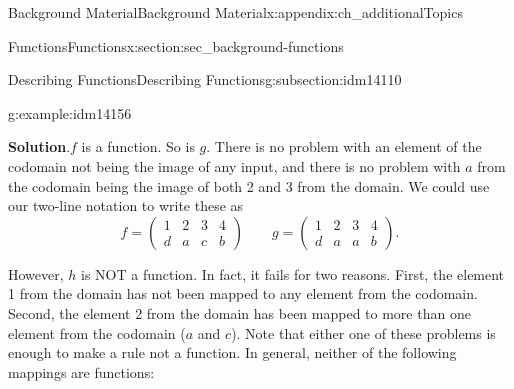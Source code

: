 \documentclass[oneside,10pt,]{book}
\numberwithin{equation}{chapter}
\newcommand{\amp}{&}
\begin{document}
\begin{appendixptx}{Background Material}{}{Background Material}{}{}{x:appendix:ch_additionalTopics}
\begin{sectionptx}{Functions}{}{Functions}{}{}{x:section:sec_background-functions}
\begin{subsectionptx}{Describing Functions}{}{Describing Functions}{}{}{g:subsection:idm14110}
\begin{example}{}{g:example:idm14156}
\begin{sidebyside}{3}{0.0416666666666667}{0.0416666666666667}{0.0833333333333333}
\begin{sbspanel}{0.25}
%
\end{sbspanel}%
\begin{sbspanel}{0.25}%
%
\end{sbspanel}%
\end{sidebyside}%
\par\smallskip%
\noindent\textbf{Solution}.\hypertarget{g:solution:idm14168}{}\quad{}\(f\) is a function. So is \(g\). There is no problem with an element of the codomain not being the image of any input, and there is no problem with \(a\) from the codomain being the image of both 2 and 3 from the domain. We could use our two-line notation to write these as%
\begin{equation*}
f= \begin{pmatrix} 1 \amp 2 \amp 3 \amp 4 \\ d \amp a \amp c \amp b \end{pmatrix} \qquad g = \begin{pmatrix} 1 \amp 2 \amp 3 \amp 4 \\ d \amp a \amp a \amp b \end{pmatrix}.
\end{equation*}
%
\par
However, \(h\) is NOT a function. In fact, it fails for two reasons. First, the element 1 from the domain has not been mapped to any element from the codomain. Second, the element 2 from the domain has been mapped to more than one element from the codomain (\(a\) and \(c\)). Note that either one of these problems is enough to make a rule not a function. In general, neither of the following mappings are functions:%

\end{example}
\end{subsectionptx}
\end{sectionptx}
\end{appendixptx}
\end{document}
